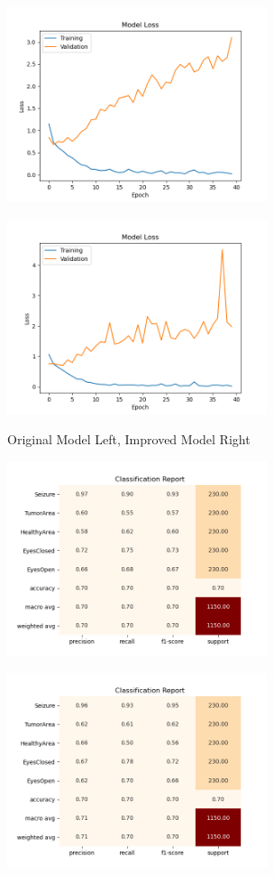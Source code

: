 \documentclass[12pt]{article}
\begin{document}
{{{{{{{{{{{\includegraphics[width = 3in]{images/CNN_losses}
{\includegraphics[width = 3in]{images/CNN_improved_losses}

\bigskip

Original Model Left, Improved Model Right

\bigskip

{\includegraphics[width = 3in]{images/CNN_classification_report}
{\includegraphics[width = 3in]{images/CNN_improved_classification_report}

}}}}}}}}}}}}}}
\end{document}
